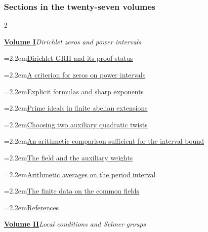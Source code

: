 \documentclass[a4paper,11pt]{article}
\theoremstyle{definition}
\theoremstyle{remark}
\numberwithin{equation}{section}
\begin{document}
\subsubsection{Sections in the twenty-seven volumes}\label{nav:series-directory}
\begingroup\small\setlength{\parskip}{1pt}\setlength{\columnsep}{1.4em}\raggedcolumns\begin{multicols}{2}
\noindent\begin{minipage}{\linewidth}\raggedright
\textbf{\hyperref[nav:volume-I]{Volume I}}\enspace\emph{Dirichlet zeros and power intervals}\par\smallskip
\noindent\hangindent=2.2em\hyperref[nav:I-00]{Dirichlet GRH and its proof status}\par
\noindent\hangindent=2.2em\hyperref[nav:I-02]{A criterion for zeros on power intervals}\par
\noindent\hangindent=2.2em\hyperref[nav:I-07]{Explicit formulas and sharp exponents}\par
\noindent\hangindent=2.2em\hyperref[nav:I-13]{Prime ideals in finite abelian extensions}\par
\noindent\hangindent=2.2em\hyperref[nav:I-16]{Choosing two auxiliary quadratic twists}\par
\noindent\hangindent=2.2em\hyperref[nav:I-22]{An arithmetic comparison sufficient for the interval bound}\par
\noindent\hangindent=2.2em\hyperref[nav:g-I-1]{The field and the auxiliary weights}\par
\noindent\hangindent=2.2em\hyperref[nav:g-I-2]{Arithmetic averages on the period interval}\par
\noindent\hangindent=2.2em\hyperref[nav:g-I-3]{The finite data on the common fields}\par
\noindent\hangindent=2.2em\hyperref[nav:bibliography-I]{References}\par
\end{minipage}\par\medskip
\noindent\begin{minipage}{\linewidth}\raggedright
\textbf{\hyperref[nav:volume-II]{Volume II}}\enspace\emph{Local conditions and Selmer groups}\par\smallskip

\end{minipage}
\end{multicols}
\end{document}
